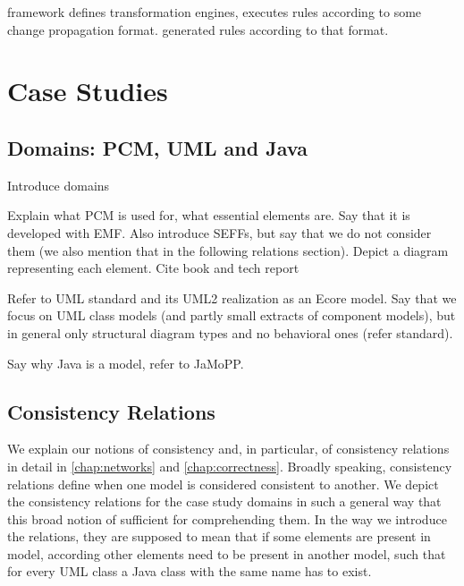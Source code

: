 \vitruv framework defines transformation engines, executes rules according to some change propagation format.
\reactionslanguage generated rules according to that format.



\section{Case Studies}

\subsection{Domains: PCM, UML and Java}
\label{chap:foundations:case_studies:domains}

Introduce domains

Explain what PCM is used for, what essential elements are. Say that it is developed with EMF. Also introduce SEFFs, but say that we do not consider them (we also  mention that in the following relations section).
Depict a diagram representing each element. Cite book and tech report

Refer to UML standard and its UML2 realization as an Ecore model. Say that we focus on UML class models (and partly small extracts of component models), but in general only structural diagram types and no behavioral ones (refer standard).

Say why Java is a model, refer to JaMoPP.


\subsection{Consistency Relations}
\label{chap:foundations:case_studies:relations}

We explain our notions of consistency and, in particular, of consistency relations in detail in \autoref{chap:networks} and \autoref{chap:correctness}.
Broadly speaking, consistency relations define when one model is considered consistent to another.
We depict the consistency relations for the case study domains in such a general way that this broad notion of sufficient for comprehending them.
In the way we introduce the relations, they are supposed to mean that if some elements are present in model, according other elements need to be present in another model, such that for every \gls{UML} class a Java class with the same name has to exist.

